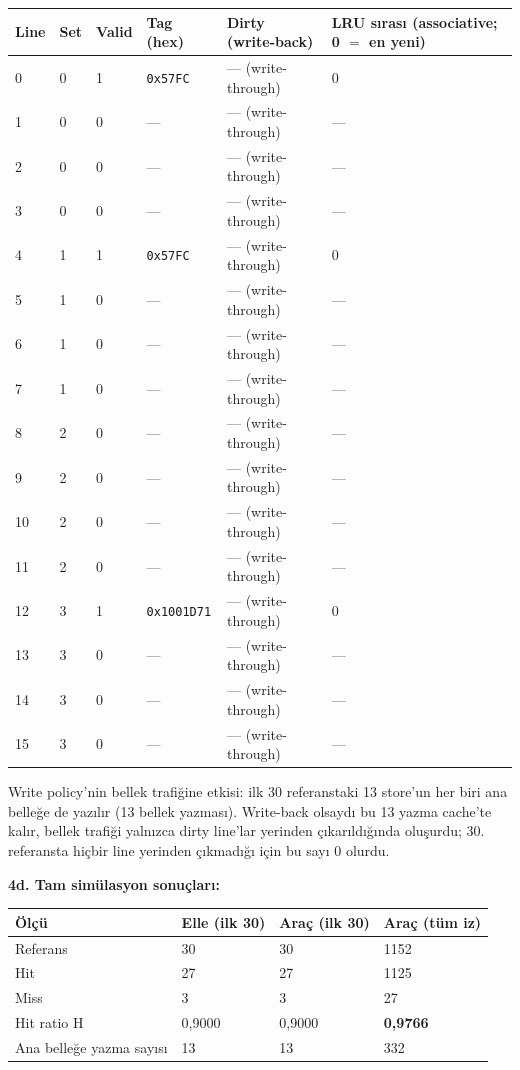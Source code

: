 \documentclass[11pt,a4paper]{article}
\newcommand{\tl}{\texttt}
\newcommand{\hd}[1]{\cellcolor{hdr}#1}
\begin{document}
{\small
\begin{longtable}{|p{1.0cm}|p{1.0cm}|p{1.2cm}|p{2.6cm}|p{3.4cm}|p{4.6cm}|}
\hline
\hd{Line} & \hd{Set} & \hd{Valid} & \hd{Tag (hex)} & \hd{Dirty (write-back)} & \hd{LRU sırası (associative; 0 $=$ en yeni)}\\
\hline
\endhead
0 & 0 & 1 & \tl{0x57FC} & --- (write-through) & 0\\
\hline
1 & 0 & 0 & --- & --- (write-through) & ---\\
\hline
2 & 0 & 0 & --- & --- (write-through) & ---\\
\hline
3 & 0 & 0 & --- & --- (write-through) & ---\\
\hline
4 & 1 & 1 & \tl{0x57FC} & --- (write-through) & 0\\
\hline
5 & 1 & 0 & --- & --- (write-through) & ---\\
\hline
6 & 1 & 0 & --- & --- (write-through) & ---\\
\hline
7 & 1 & 0 & --- & --- (write-through) & ---\\
\hline
8 & 2 & 0 & --- & --- (write-through) & ---\\
\hline
9 & 2 & 0 & --- & --- (write-through) & ---\\
\hline
10 & 2 & 0 & --- & --- (write-through) & ---\\
\hline
11 & 2 & 0 & --- & --- (write-through) & ---\\
\hline
12 & 3 & 1 & \tl{0x1001D71} & --- (write-through) & 0\\
\hline
13 & 3 & 0 & --- & --- (write-through) & ---\\
\hline
14 & 3 & 0 & --- & --- (write-through) & ---\\
\hline
15 & 3 & 0 & --- & --- (write-through) & ---\\
\hline
\end{longtable}
}

Write policy'nin bellek trafiğine etkisi: ilk 30 referanstaki 13 store'un her biri ana belleğe
de yazılır (13 bellek yazması). Write-back olsaydı bu 13 yazma cache'te kalır, bellek trafiği
yalnızca dirty line'lar yerinden çıkarıldığında oluşurdu; 30. referansta hiçbir line yerinden
çıkmadığı için bu sayı 0 olurdu.

\textbf{4d. Tam simülasyon sonuçları:}

\begin{longtable}{|p{5.4cm}|p{3.2cm}|p{3.2cm}|p{3.2cm}|}
\hline
\hd{Ölçü} & \hd{Elle (ilk 30)} & \hd{Araç (ilk 30)} & \hd{Araç (tüm iz)}\\
\hline
Referans & 30 & 30 & 1152\\ \hline
Hit & 27 & 27 & 1125\\ \hline
Miss & 3 & 3 & 27\\ \hline
Hit ratio H & 0,9000 & 0,9000 & \textbf{0,9766}\\ \hline
Ana belleğe yazma sayısı & 13 & 13 & 332\\ \hline
\end{longtable}
\end{document}
